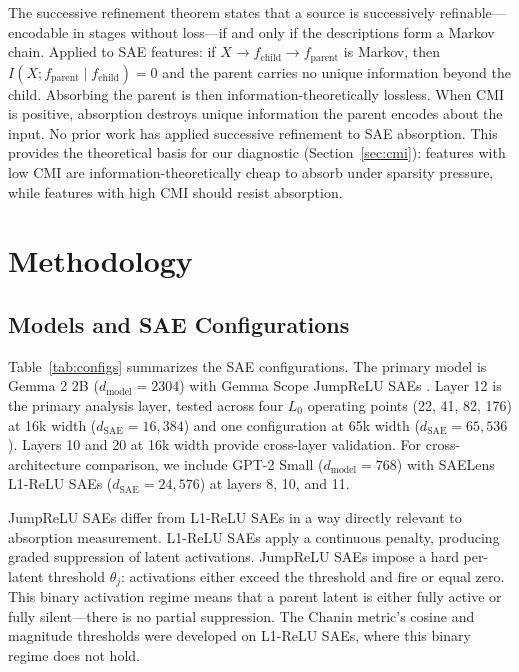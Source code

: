 \documentclass{article}
\begin{document}
The successive refinement theorem \citep{equitz1991successive} states that a source is successively refinable---encodable in stages without loss---if and only if the descriptions form a Markov chain. Applied to SAE features: if $X \to f_{\text{child}} \to f_{\text{parent}}$ is Markov, then $I(X; f_{\text{parent}} \mid f_{\text{child}}) = 0$ and the parent carries no unique information beyond the child. Absorbing the parent is then information-theoretically lossless. When CMI is positive, absorption destroys unique information the parent encodes about the input. No prior work has applied successive refinement to SAE absorption. This provides the theoretical basis for our diagnostic (Section~\ref{sec:cmi}): features with low CMI are information-theoretically cheap to absorb under sparsity pressure, while features with high CMI should resist absorption.


\section{Methodology}
\label{sec:method}

\subsection{Models and SAE Configurations}

Table~\ref{tab:configs} summarizes the SAE configurations. The primary model is Gemma 2 2B ($d_{\text{model}} = 2304$) with Gemma Scope JumpReLU SAEs \citep{lieberum2024gemmascope, rajamanoharan2024jumprelu}. Layer 12 is the primary analysis layer, tested across four $L_0$ operating points (22, 41, 82, 176) at 16k width ($d_{\text{SAE}} = 16{,}384$) and one configuration at 65k width ($d_{\text{SAE}} = 65{,}536$). Layers 10 and 20 at 16k width provide cross-layer validation. For cross-architecture comparison, we include GPT-2 Small ($d_{\text{model}} = 768$) with SAELens L1-ReLU SAEs ($d_{\text{SAE}} = 24{,}576$) at layers 8, 10, and 11.

JumpReLU SAEs differ from L1-ReLU SAEs in a way directly relevant to absorption measurement. L1-ReLU SAEs apply a continuous penalty, producing graded suppression of latent activations. JumpReLU SAEs impose a hard per-latent threshold $\theta_j$: activations either exceed the threshold and fire or equal zero. This binary activation regime means that a parent latent is either fully active or fully silent---there is no partial suppression. The Chanin metric's cosine and magnitude thresholds were developed on L1-ReLU SAEs, where this binary regime does not hold.
\end{document}
